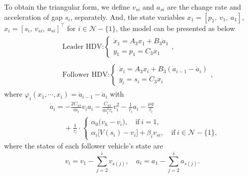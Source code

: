 \documentclass{ifacconf}
\begin{document}
To obtain the triangular form, we define $v_{si}$ and $a_{si}$ are the change rate and acceleration of gap $s_i$, separately. And, the state variables $x_1=[p_1,\ v_1,\ a_1]$, $x_i = [s_i,\ v_{si},\ a_{si}]^\top$ for $i\in\mathcal{N}-\{1\}$, the model can be presented as below
\begin{subequations}
\begin{align}
    &\begin{aligned}
        &\text{Leader HDV:}\left\{\begin{array}{l}
\dot{x}_1=A_3x_1+B_3\dot{a}_1\\
y_1=p_1=C_3x_1
\end{array}\right.,
    \end{aligned}\\
    &\begin{aligned}
        &\text{Follower HDV:}\left\{\begin{array}{l}
\dot{x}_i=A_3x_i+B_3(\dot{a}_{i-1}-\dot{a}_i)\\
y_i=s_i=C_3x_i
\end{array}\right.,
    \end{aligned}
\end{align}
\end{subequations}
where $\varphi_i(x_1,\cdots,x_i)=\dot{a}_{i-1}-\dot{a}_i$ with
\begin{equation}
    \begin{aligned}
        &\dot{a}_i = -\frac{2 C_{wi}}{m_i}v_ia_i-\frac{C_{wi}}{m_i^2\tau_i}v_i^2-\frac{1}{\tau_i}a_i-\frac{\mu g}{\tau_i}\\
        &\quad\quad+\frac{1}{\tau_i}\cdot\begin{cases}
            \alpha_0\big(v_h-v_{i}\big),\quad \mathrm{if}\ i=1,\\
            \alpha_i\big[V(s_i)-v_{i}\big]+\beta_iv_{si},\quad \mathrm{if}\  i\in \mathcal{N}-\{1\},
        \end{cases}
    \end{aligned}\nonumber
\end{equation}
where the states of each follower vehicle's state are
\[v_i=v_1 - \sum_{j=2}^{i} v_{s(j)}, \quad a_i=a_1 - \sum_{j=2}^{i} a_{s(j)}.\]
\vspace*{-0.3 cm}
\end{document}
